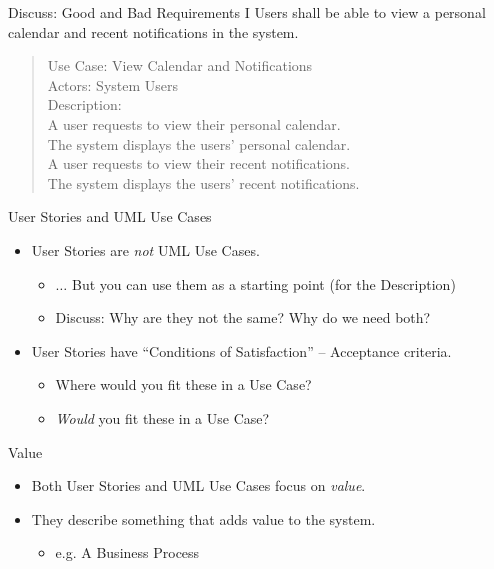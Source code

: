 \documentclass[10pt,t,a4paper]{beamer}
\begin{document}
\begin{frame}[label=sec-1-3]{Discuss: Good and Bad Requirements I}
Users shall be able to view a personal calendar and recent notifications in the system.

\begin{verse}
Use Case: View Calendar and Notifications \\
Actors: System Users \\
Description: \\
\hspace*{2em}A user requests to view their personal calendar. \\
\hspace*{4em}The system displays the users' personal calendar. \\
\hspace*{2em}A user requests to view their recent notifications. \\
\hspace*{4em}The system displays the users' recent notifications. \\
\end{verse}

\end{frame}
\begin{frame}[label=sec-1-4]{User Stories and UML Use Cases}
\begin{itemize}
\item User Stories are \emph{not} UML Use Cases.
\begin{itemize}
\item $\ldots$ But you can use them as a starting point (for the Description)
\item \alert{Discuss:} Why are they not the same? Why do we need both?
\end{itemize}
\item User Stories have ``Conditions of Satisfaction'' -- Acceptance criteria.
\begin{itemize}
\item Where would you fit these in a Use Case?
\item \emph{Would} you fit these in a Use Case?
\end{itemize}
\end{itemize}

\begin{block}{Value}
\begin{itemize}
\item Both User Stories and UML Use Cases focus on \emph{value}.
\item They describe something that adds value to the system.
\begin{itemize}
\item e.g. A Business Process
\end{itemize}
\end{itemize}
\end{block}
\end{frame}
\end{document}
